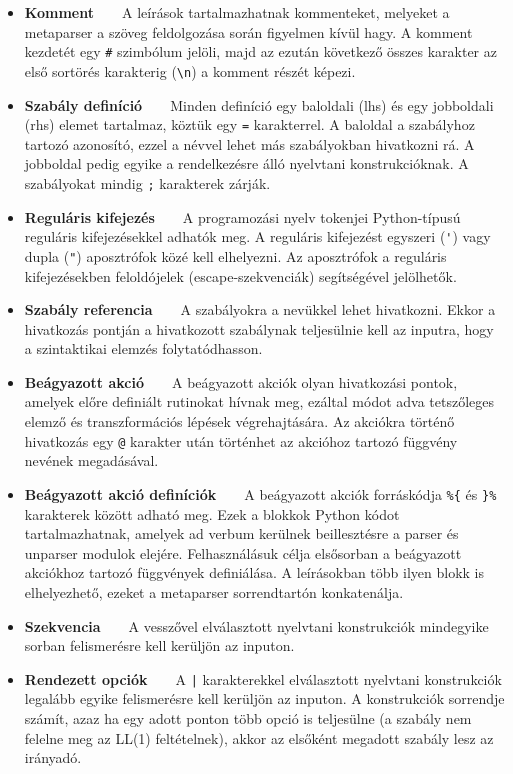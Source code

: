 \documentclass[twoside, 12pt]{report}
\begin{document}
\begin{itemize}[noitemsep]
  \item \textbf{Komment}\ \ \ \ A leírások tartalmazhatnak kommenteket, melyeket a metaparser a szöveg feldolgozása során figyelmen kívül hagy. A komment kezdetét egy \verb|#| szimbólum jelöli, majd az ezután következő összes karakter az első sortörés karakterig (\verb|\n|) a komment részét képezi.
  \item \textbf{Szabály definíció}\ \ \ \ Minden definíció egy baloldali (lhs) és egy jobboldali (rhs) elemet tartalmaz, köztük egy \verb|=| karakterrel. A baloldal a szabályhoz tartozó azonosító, ezzel a névvel lehet más szabályokban hivatkozni rá. A jobboldal pedig egyike a rendelkezésre álló nyelvtani konstrukcióknak. A szabályokat mindig \verb|;| karakterek zárják.
  \item \textbf{Reguláris kifejezés}\ \ \ \ A programozási nyelv tokenjei Python-típusú reguláris kifejezésekkel \parencite{Kuca} adhatók meg. A reguláris kifejezést egyszeri (\verb|'|) vagy dupla (\verb|"|) aposztrófok közé kell elhelyezni. Az aposztrófok a reguláris kifejezésekben feloldójelek (escape-szekvenciák) segítségével jelölhetők.
  \item \textbf{Szabály referencia}\ \ \ \ A szabályokra a nevükkel lehet hivatkozni. Ekkor a hivatkozás pontján a hivatkozott szabálynak teljesülnie kell az inputra, hogy a szintaktikai elemzés folytatódhasson.
  \item \textbf{Beágyazott akció}\ \ \ \ A beágyazott akciók olyan hivatkozási pontok, amelyek előre definiált rutinokat hívnak meg, ezáltal módot adva tetszőleges elemző és transzformációs lépések végrehajtására. Az akciókra történő hivatkozás egy \verb|@| karakter után történhet az akcióhoz tartozó függvény nevének megadásával.
  \item \textbf{Beágyazott akció definíciók}\ \ \ \ A beágyazott akciók forráskódja \verb|%{| és \verb|}%| karakterek között adható meg. Ezek a blokkok Python kódot tartalmazhatnak, amelyek ad verbum kerülnek beillesztésre a parser és unparser modulok elejére. Felhasználásuk célja elsősorban a beágyazott akciókhoz tartozó függvények definiálása. A leírásokban több ilyen blokk is elhelyezhető, ezeket a metaparser sorrendtartón konkatenálja.
  \item \textbf{Szekvencia}\ \ \ \ A vesszővel elválasztott nyelvtani konstrukciók mindegyike sorban felismerésre kell kerüljön az inputon.
  \item \textbf{Rendezett opciók}\ \ \ \ A \verb=|= karakterekkel elválasztott nyelvtani konstrukciók legalább egyike felismerésre kell kerüljön az inputon. A konstrukciók sorrendje számít, azaz ha egy adott ponton több opció is teljesülne (a szabály nem felelne meg az LL(1) feltételnek), akkor az elsőként megadott szabály lesz az irányadó.

\end{itemize}
\end{document}
